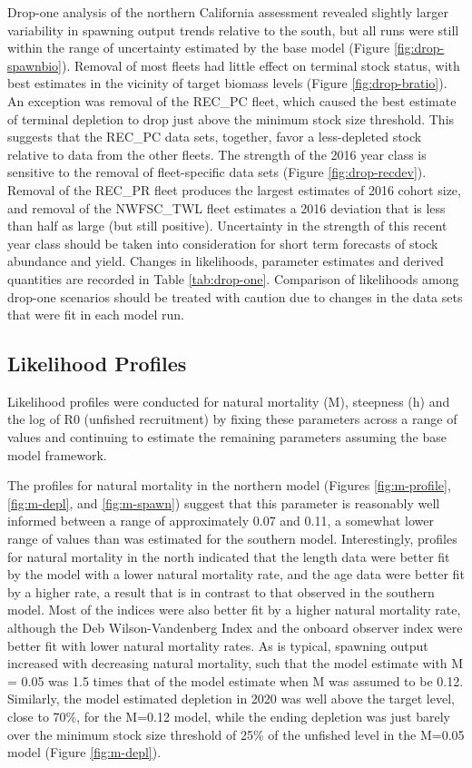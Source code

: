 \documentclass[
  english,
  a4paper,
]{article}
\begin{document}
Drop-one analysis of the northern California assessment revealed slightly larger variability in spawning output trends relative to the south, but all runs were still within the range of uncertainty estimated by the base model (Figure \ref{fig:drop-spawnbio}). Removal of most fleets had little effect on terminal stock status, with best estimates in the vicinity of target biomass levels (Figure \ref{fig:drop-bratio}). An exception was removal of the REC\_PC fleet, which caused the best estimate of terminal depletion to drop just above the minimum stock size threshold. This suggests that the REC\_PC data sets, together, favor a less-depleted stock relative to data from the other fleets. The strength of the 2016 year class is sensitive to the removal of fleet-specific data sets (Figure \ref{fig:drop-recdev}). Removal of the REC\_PR fleet produces the largest estimates of 2016 cohort size, and removal of the NWFSC\_TWL fleet estimates a 2016 deviation that is less than half as large (but still positive). Uncertainty in the strength of this recent year class should be taken into consideration for short term forecasts of stock abundance and yield. Changes in likelihoods, parameter estimates and derived quantities are recorded in Table \ref{tab:drop-one}. Comparison of likelihoods among drop-one scenarios should be treated with caution due to changes in the data sets that were fit in each model run.

\hypertarget{likelihood-profiles}{%
\subsection{Likelihood Profiles}\label{likelihood-profiles}}

Likelihood profiles were conducted for natural mortality (M), steepness (h) and the log of R0 (unfished recruitment) by fixing these parameters across a range of values and continuing to estimate the remaining parameters assuming the base model framework.

The profiles for natural mortality in the northern model (Figures \ref{fig:m-profile}, \ref{fig:m-depl}, and \ref{fig:m-spawn}) suggest that this parameter is reasonably well informed between a range of approximately 0.07 and 0.11, a somewhat lower range of values than was estimated for the southern model. Interestingly, profiles for natural mortality in the north indicated that the length data were better fit by the model with a lower natural mortality rate, and the age data were better fit by a higher rate, a result that is in contrast to that observed in the southern model. Most of the indices were also better fit by a higher natural mortality rate, although the Deb Wilson-Vandenberg Index and the onboard observer index were better fit with lower natural mortality rates. As is typical, spawning output increased with decreasing natural mortality, such that the model estimate with M = 0.05 was 1.5 times that of the model estimate when M was assumed to be 0.12. Similarly, the model estimated depletion in 2020 was well above the target level, close to 70\%, for the M=0.12 model, while the ending depletion was just barely over the minimum stock size threshold of 25\% of the unfished level in the M=0.05 model (Figure \ref{fig:m-depl}).
\end{document}
